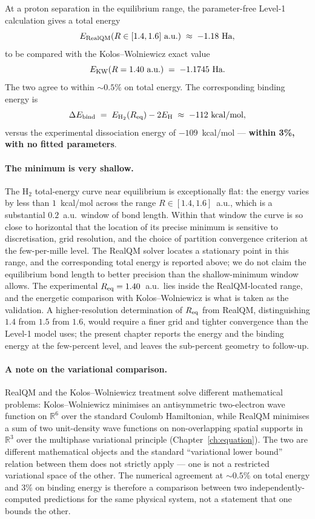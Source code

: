 At a proton separation in the equilibrium range, the parameter-free Level-1 calculation gives a total energy
\[
E_{\rm RealQM}(R \in [1.4, 1.6]\ \text{a.u.}) \;\approx\; -1.18 \text{ Ha},
\]
to be compared with the Kolos--Wolniewicz exact value
\[
E_{\rm KW}(R = 1.40\ \text{a.u.}) \;=\; -1.1745 \text{ Ha}.
\]
The two agree to within $\sim 0.5\%$ on total energy. The corresponding binding energy is
\[
\Delta E_{\rm bind} \;=\; E_{\rm H_2}(R_{\rm eq}) - 2 E_{\rm H} \;\approx\; -112 \text{ kcal/mol},
\]
versus the experimental dissociation energy of $-109$~kcal/mol --- \textbf{within 3\%, with no fitted parameters}.

\paragraph{The minimum is very shallow.}
The H$_2$ total-energy curve near equilibrium is exceptionally flat: the energy varies by less than $1$~kcal/mol across the range $R \in [1.4, 1.6]$~a.u., which is a substantial $0.2$~a.u.\ window of bond length. Within that window the curve is so close to horizontal that the location of its precise minimum is sensitive to discretisation, grid resolution, and the choice of partition convergence criterion at the few-per-mille level. The RealQM solver locates a stationary point in this range, and the corresponding total energy is reported above; we do not claim the equilibrium bond length to better precision than the shallow-minimum window allows. The experimental $R_{\rm eq} = 1.40$~a.u.\ lies inside the RealQM-located range, and the energetic comparison with Kolos--Wolniewicz is what is taken as the validation. A higher-resolution determination of $R_{\rm eq}$ from RealQM, distinguishing $1.4$ from $1.5$ from $1.6$, would require a finer grid and tighter convergence than the Level-1 model uses; the present chapter reports the energy and the binding energy at the few-percent level, and leaves the sub-percent geometry to follow-up.

\paragraph{A note on the variational comparison.}
RealQM and the Kolos--Wolniewicz treatment solve different mathematical problems: Kolos--Wolniewicz minimises an antisymmetric two-electron wave function on $\mathbb{R}^6$ over the standard Coulomb Hamiltonian, while RealQM minimises a sum of two unit-density wave functions on non-overlapping spatial supports in $\mathbb{R}^3$ over the multiphase variational principle (Chapter~\ref{ch:equation}). The two are different mathematical objects and the standard ``variational lower bound'' relation between them does not strictly apply --- one is not a restricted variational space of the other. The numerical agreement at $\sim 0.5\%$ on total energy and $3\%$ on binding energy is therefore a comparison between two independently-computed predictions for the same physical system, not a statement that one bounds the other.


